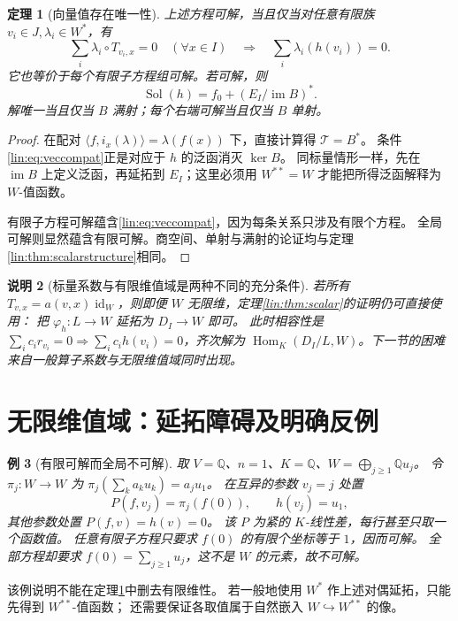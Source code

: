 \documentclass[11pt,a4paper,oneside,openany]{book}
\theoremstyle{lecture}
\newtheorem{theorem}{定理}[section]
\newtheorem{example}[theorem]{例}
\newtheorem{remark}[theorem]{说明}
\newcommand{\Q}{\mathbb Q}
\newcommand{\Hom}{\operatorname{Hom}}
\newcommand{\im}{\operatorname{im}}
\newcommand{\id}{\operatorname{id}}
\newcommand{\T}{\mathcal T}
\newcommand{\Sol}{\operatorname{Sol}}
\numberwithin{equation}{section}
\begin{document}
\begin{theorem}[向量值存在唯一性]\label{lin:thm:vectorfinite}
上述方程可解，当且仅当对任意有限族 $v_i\in J,\lambda_i\in W^*$，有
\begin{equation}\label{lin:eq:veccompat}
 \sum_i\lambda_i\circ T_{v_i,x}=0\quad(\forall x\in I)
 \quad\Longrightarrow\quad
 \sum_i\lambda_i(h(v_i))=0.
\end{equation}
它也等价于每个有限子方程组可解。若可解，则
\[
 \Sol(h)=f_0+(E_I/\im B)^*.
\]
解唯一当且仅当 $B$ 满射；每个右端可解当且仅当 $B$ 单射。
\end{theorem}
\begin{proof}
在配对 $\langle f,i_x(\lambda)\rangle=\lambda(f(x))$ 下，直接计算得 $\T=B^*$。
条件\eqref{lin:eq:veccompat}正是对应于 $h$ 的泛函消灭 $\ker B$。
同标量情形一样，先在 $\im B$ 上定义泛函，再延拓到 $E_I$；这里必须用 $W^{**}=W$ 才能把所得泛函解释为 $W$-值函数。

有限子方程可解蕴含\eqref{lin:eq:veccompat}，因为每条关系只涉及有限个方程。
全局可解则显然蕴含有限可解。商空间、单射与满射的论证均与定理\ref{lin:thm:scalarstructure}相同。
\end{proof}

\begin{remark}[标量系数与有限维值域是两种不同的充分条件]
若所有 $T_{v,x}=a(v,x)\id_W$，则即便 $W$ 无限维，定理\ref{lin:thm:scalar}的证明仍可直接使用：
把 $\varphi_h:L\to W$ 延拓为 $D_I\to W$ 即可。
此时相容性是 $\sum_i c_ir_{v_i}=0\Rightarrow\sum_i c_i h(v_i)=0$，齐次解为
$\Hom_K(D_I/L,W)$。下一节的困难来自一般算子系数与无限维值域同时出现。
\end{remark}

\section{无限维值域：延拓障碍及明确反例}\label{lin:sec:infinite}
\begin{example}[有限可解而全局不可解]\label{lin:ex:infinite}
取 $V=\Q$、$n=1$、$K=\Q$、$W=\bigoplus_{j\ge1}\Q u_j$。
令 $\pi_j:W\to W$ 为 $\pi_j(\sum_k a_ku_k)=a_ju_1$。
在互异的参数 $v_j=j$ 处置
\[
 P(f,v_j)=\pi_j(f(0)),\qquad h(v_j)=u_1,
\]
其他参数处置 $P(f,v)=h(v)=0$。
该 $P$ 为紧的 $K$-线性差，每行甚至只取一个函数值。
任意有限子方程只要求 $f(0)$ 的有限个坐标等于 $1$，因而可解。
全部方程却要求 $f(0)=\sum_{j\ge1}u_j$，这不是 $W$ 的元素，故不可解。
\end{example}
该例说明不能在定理\ref{lin:thm:vectorfinite}中删去有限维性。
若一般地使用 $W^*$ 作上述对偶延拓，只能先得到 $W^{**}$-值函数；
还需要保证各取值属于自然嵌入 $W\hookrightarrow W^{**}$ 的像。
\end{document}
